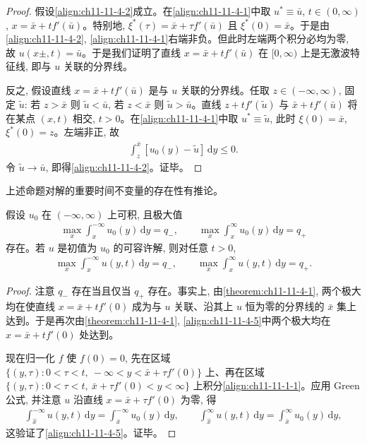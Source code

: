 \documentclass[../../main.tex]{subfiles}
\begin{document}
\begin{proof}
假设\eqref{align:ch11-11-4-2}成立。在\eqref{align:ch11-11-4-1}中取 $u^*\equiv\bar u$, $t\in(0,\infty)$, $x=\bar x+tf'(\bar u)$。特别地, $\xi^*(\tau)=\bar x+\tau f'(\bar u)$ 且 $\xi^*(0)=\bar x$。于是由\eqref{align:ch11-11-4-2}, \eqref{align:ch11-11-4-1}右端非负。但此时左端两个积分必均为零, 故 $u(x\pm,t)=\bar u$。于是我们证明了直线 $x=\bar x+tf'(\bar u)$ 在 $[0,\infty)$ 上是无激波特征线, 即与 $u$ 关联的分界线。

反之, 假设直线 $x=\bar x+tf'(\bar u)$ 是与 $u$ 关联的分界线。任取 $z\in(-\infty,\infty)$, 固定 $\tilde u$: 若 $z>\bar x$ 则 $\tilde u<\bar u$, 若 $z<\bar x$ 则 $\tilde u>\bar u$。直线 $z+tf'(\tilde u)$ 与 $\bar x+tf'(\bar u)$ 将在某点 $(x,t)$ 相交, $t>0$。在\eqref{align:ch11-11-4-1}中取 $u^*\equiv\tilde u$, 此时 $\xi(0)=\bar x$, $\xi^*(0)=z$。左端非正, 故
\begin{align}
\int_z^{\bar x}[u_0(y)-\tilde u]\,\mathrm{d}y\leqslant0.\label{align:ch11-11-4-3}
\end{align}
令 $\tilde u\to\bar u$, 即得\eqref{align:ch11-11-4-2}。证毕。
\end{proof}

上述命题对解的重要时间不变量的存在性有推论。

\begin{theorem}\label{theorem:ch11-11-4-2}
假设 $u_0$ 在 $(-\infty,\infty)$ 上可积, 且极大值
\begin{align}
\max_x\int_x^{-\infty}u_0(y)\,\mathrm{d}y=q_-,\qquad \max_x\int_x^\infty u_0(y)\,\mathrm{d}y=q_+\label{align:ch11-11-4-4}
\end{align}
存在。若 $u$ 是初值为 $u_0$ 的可容许解, 则对任意 $t>0$,
\begin{align}
\max_x\int_x^{-\infty}u(y,t)\,\mathrm{d}y=q_-,\qquad \max_x\int_x^\infty u(y,t)\,\mathrm{d}y=q_+.\label{align:ch11-11-4-5}
\end{align}
\end{theorem}

\begin{proof}
注意 $q_-$ 存在当且仅当 $q_+$ 存在。事实上, 由\cref{theorem:ch11-11-4-1}, 两个极大均在使直线 $x=\bar x+tf'(0)$ 成为与 $u$ 关联、沿其上 $u$ 恒为零的分界线的 $\bar x$ 集上达到。于是再次由\cref{theorem:ch11-11-4-1}, \eqref{align:ch11-11-4-5}中两个极大均在 $\hat x=\bar x+tf'(0)$ 处达到。

现在归一化 $f$ 使 $f(0)=0$, 先在区域 $\{(y,\tau):0<\tau<t,\ -\infty<y<\bar x+\tau f'(0)\}$ 上、再在区域 $\{(y,\tau):0<\tau<t,\ \bar x+\tau f'(0)<y<\infty\}$ 上积分\eqref{align:ch11-11-1-1}。应用 Green 公式, 并注意 $u$ 沿直线 $x=\bar x+\tau f'(0)$ 为零, 得
\begin{align}
\int_{\hat x}^{-\infty}u(y,t)\,\mathrm{d}y=\int_{\bar x}^{-\infty}u_0(y)\,\mathrm{d}y,\qquad
\int_{\hat x}^\infty u(y,t)\,\mathrm{d}y=\int_{\bar x}^\infty u_0(y)\,\mathrm{d}y,\label{align:ch11-11-4-6}
\end{align}
这验证了\eqref{align:ch11-11-4-5}。证毕。
\end{proof}
\end{document}
